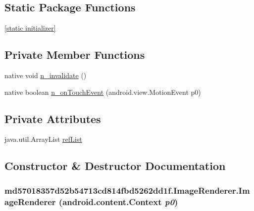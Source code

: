 \subsection*{Static Package Functions}
\begin{CompactItemize}
\item 
\hyperlink{classmd57018357d52b54713cd814fbd5262dd1f_1_1_image_renderer_58d0a43ac031b39951a2c4c54ac9eaf3}{\mbox{[}static initializer\mbox{]}}
\end{CompactItemize}
\subsection*{Private Member Functions}
\begin{CompactItemize}
\item 
native void \hyperlink{classmd57018357d52b54713cd814fbd5262dd1f_1_1_image_renderer_5f202a7e86ff8e17c3eff23fa28e3abd}{n\_\-invalidate} ()
\item 
native boolean \hyperlink{classmd57018357d52b54713cd814fbd5262dd1f_1_1_image_renderer_b3a8104db2421034514e859324e37932}{n\_\-onTouchEvent} (android.view.MotionEvent p0)
\end{CompactItemize}
\subsection*{Private Attributes}
\begin{CompactItemize}
\item 
java.util.ArrayList \hyperlink{classmd57018357d52b54713cd814fbd5262dd1f_1_1_image_renderer_a8958605027a4bc0fadeb74bef6e6aef}{refList}
\end{CompactItemize}


\subsection{Constructor \& Destructor Documentation}
\hypertarget{classmd57018357d52b54713cd814fbd5262dd1f_1_1_image_renderer_75085da3c8269f5e0e8053ea9f2804a7}{
\subsubsection[{ImageRenderer}]{\setlength{\rightskip}{0pt plus 5cm}md57018357d52b54713cd814fbd5262dd1f.ImageRenderer.ImageRenderer (android.content.Context {\em p0})}}
\label{classmd57018357d52b54713cd814fbd5262dd1f_1_1_image_renderer_75085da3c8269f5e0e8053ea9f2804a7}


